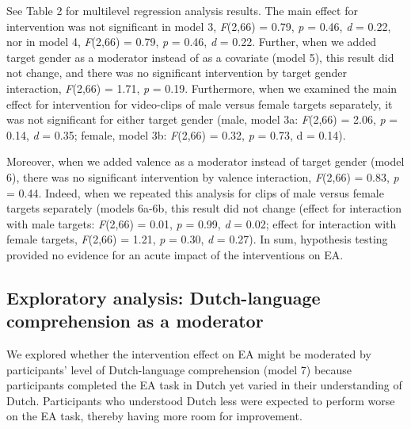 \documentclass[authordate, empirical, issue]{jote-new-article}
\begin{document}
See Table 2 for multilevel regression analysis results. The main effect for intervention was not significant in model 3, \emph{F}(2,66) = 0.79, \emph{p} = 0.46, \emph{d} = 0.22, nor in model 4, \emph{F}(2,66) = 0.79, \emph{p} = 0.46, \emph{d} = 0.22. Further, when we added target gender as a moderator instead of as a covariate (model 5), this result did not change, and there was no significant intervention by target gender interaction, \emph{F}(2,66) = 1.71, \emph{p} = 0.19. Furthermore, when we examined the main effect for intervention for video-clips of male versus female targets separately, it was not significant for either target gender (male, model 3a: \emph{F}(2,66) = 2.06, \emph{p} = 0.14, \emph{d} = 0.35; female, model 3b: \emph{F}(2,66) = 0.32, \emph{p} = 0.73, d = 0.14).



Moreover, when we added valence as a moderator instead of target gender (model 6), there was no significant intervention by valence interaction, \emph{F}(2,66) = 0.83, \emph{p} = 0.44. Indeed, when we repeated this analysis for clips of male versus female targets separately (models 6a-6b, this result did not change (effect for interaction with male targets: \emph{F}(2,66) = 0.01, \emph{p} = 0.99, \emph{d }= 0.02; effect for interaction with female targets, \emph{F}(2,66) = 1.21, \emph{p} = 0.30, \emph{d} = 0.27). In sum, hypothesis testing provided no evidence for an acute impact of the interventions on EA.



\subsection{Exploratory analysis: Dutch-language comprehension as a moderator}



We explored whether the intervention effect on EA might be moderated by participants' level of Dutch-language comprehension (model 7) because participants completed the EA task in Dutch yet varied in their understanding of Dutch. Participants who understood Dutch less were expected to perform worse on the EA task, thereby having more room for improvement.
\end{document}

